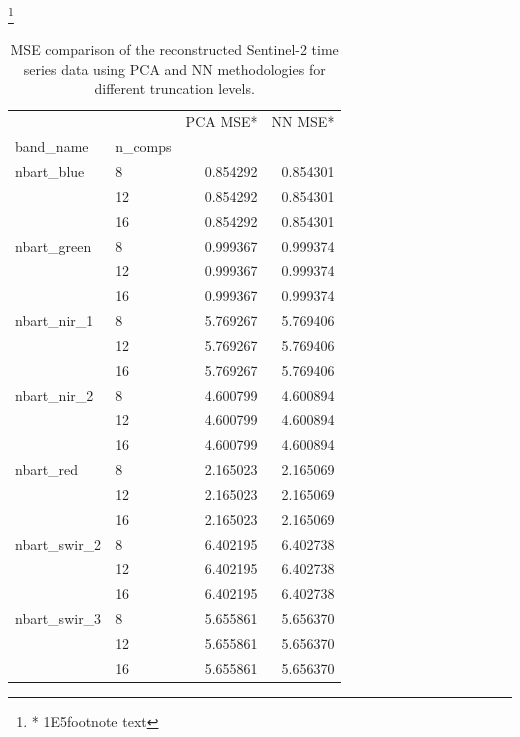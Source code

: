 \documentclass[essd, manuscript]{copernicus}
\begin{document}
\begin{table}
\centering
\caption{MSE comparison of the reconstructed Sentinel-2 time series data using PCA and NN methodologies for different truncation levels.}
\footnote{* 1E5footnote text}
\label{components_error}
\begin{tabular}{llrr}
\toprule
             &    &   PCA MSE* &    NN MSE* \\
band\_name & n\_comps &           &           \\
\midrule
nbart\_blue & 8  &  0.854292 &  0.854301 \\
             & 12 &  0.854292 &  0.854301 \\
             & 16 &  0.854292 &  0.854301 \\
nbart\_green & 8  &  0.999367 &  0.999374 \\
             & 12 &  0.999367 &  0.999374 \\
             & 16 &  0.999367 &  0.999374 \\
nbart\_nir\_1 & 8  &  5.769267 &  5.769406 \\
             & 12 &  5.769267 &  5.769406 \\
             & 16 &  5.769267 &  5.769406 \\
nbart\_nir\_2 & 8  &  4.600799 &  4.600894 \\
             & 12 &  4.600799 &  4.600894 \\
             & 16 &  4.600799 &  4.600894 \\
nbart\_red & 8  &  2.165023 &  2.165069 \\
             & 12 &  2.165023 &  2.165069 \\
             & 16 &  2.165023 &  2.165069 \\
nbart\_swir\_2 & 8  &  6.402195 &  6.402738 \\
             & 12 &  6.402195 &  6.402738 \\
             & 16 &  6.402195 &  6.402738 \\
nbart\_swir\_3 & 8  &  5.655861 &  5.656370 \\
             & 12 &  5.655861 &  5.656370 \\
             & 16 &  5.655861 &  5.656370 \\
\bottomrule
\end{tabular}
\end{table}
\end{document}
